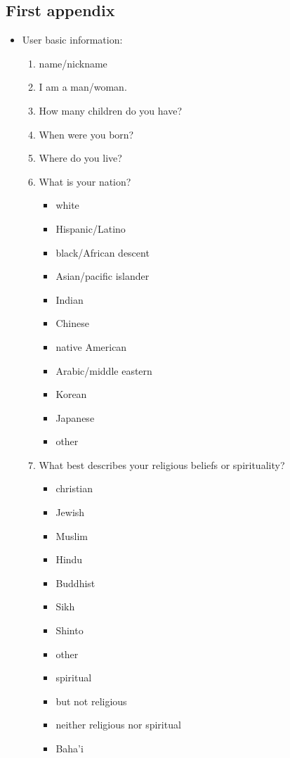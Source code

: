 \begin{appendices}
	
	\section{First appendix}
	\appendix
	\begin{itemize}
		\item User basic information:
		\begin{enumerate}
			\item name/nickname
			\item I am a man/woman.
			\item How many children do you have?
			\item When were you born?
			\item Where do you live?
			\item What is your nation?
			\begin{itemize}
				\item white
				\item Hispanic/Latino
				\item black/African descent
				\item Asian/pacific islander
				\item Indian
				\item Chinese			
				\item native American
				\item Arabic/middle eastern
				\item Korean
				\item Japanese
				\item other
			\end{itemize}
			\item What best describes your religious beliefs or spirituality?
			\begin{itemize}
				\item christian
				\item Jewish
				\item Muslim
				\item Hindu
				\item Buddhist
				\item Sikh
				\item Shinto
				\item other
				\item spiritual
				\item but not religious
				\item neither religious nor spiritual
				\item Baha'i

\end{itemize}
\end{enumerate}
\end{itemize}
\end{appendices}
